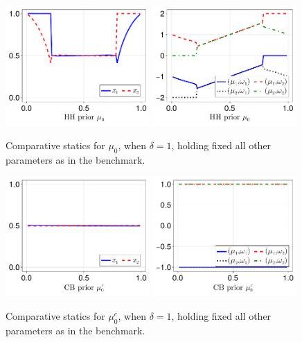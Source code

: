 \documentclass[12pt,a4paper]{article}
\begin{document}
\begin{figure}[H]
\centering
\includegraphics[width=0.49\textwidth]{figures/V8/γ_1/fig_optimal_π_across_μ_0_ω_1_1_ω_2_-1_δ_1.0_.pdf}
\includegraphics[width=0.49\textwidth]{figures/V8/γ_1/fig_posterior_across_μ_0_ω_1_1_ω_2_-1_δ_1.0_.pdf}
\caption{Comparative statics for $\mu_0$, when $\delta=1$, holding fixed all other parameters as in the benchmark.}
\label{FigureA23}
\end{figure}

\begin{figure}[H]
\centering
\includegraphics[width=0.49\textwidth]{figures/V8/γ_1/fig_optimal_π_across_μ_0_c_ω_1_1_ω_2_-1_δ_1.0_.pdf}
\includegraphics[width=0.49\textwidth]{figures/V8/γ_1/fig_posterior_across_μ_0_c_ω_1_1_ω_2_-1_δ_1.0_.pdf}
\caption{Comparative statics for $\mu_0^c$, when $\delta=1$, holding fixed all other parameters as in the benchmark.}
\label{FigureA24}
\end{figure}
\end{document}
